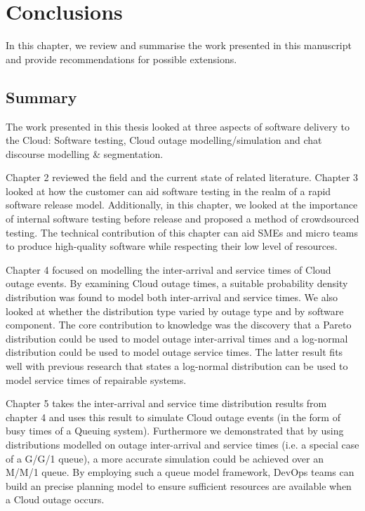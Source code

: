 
\chapter{Conclusions}\label{ch:conc} %

\begin{textsl}
{\small In this chapter, we review and summarise the work presented in this manuscript and provide
recommendations for possible extensions.}
\end{textsl}

\vspace*{1cm}

\section{Summary}
The work presented in this thesis looked at three aspects of software delivery to the Cloud: Software testing, Cloud outage modelling/simulation and chat discourse modelling \& segmentation.

Chapter 2 reviewed the field and the current state of related literature. Chapter 3 looked at how the customer can aid software testing in the realm of a rapid software release model. Additionally, in this chapter, we looked at the importance of internal software testing before release and proposed a method of crowdsourced testing. The technical contribution of this chapter can aid SMEs and micro teams to produce high-quality software while respecting their low level of resources.

Chapter 4 focused on modelling the inter-arrival and service times of Cloud outage events. By examining Cloud outage times, a suitable probability density distribution was found to model both inter-arrival and service times. We also looked at whether the distribution type varied by outage type and by software component. The core contribution to knowledge was the discovery that a Pareto distribution could be used to model outage inter-arrival times and a log-normal distribution could be used to model outage service times. The latter result fits well with previous research that states a log-normal distribution can be used to model service times of repairable systems. 

Chapter 5 takes the inter-arrival and service time distribution results from chapter 4 and uses this result to simulate Cloud outage events (in the form of busy times of a Queuing system). Furthermore we demonstrated that by using distributions modelled on outage inter-arrival and service times (i.e. a special case of a G/G/1 queue), a more accurate simulation could be achieved over an M/M/1 queue. By employing such a queue model framework, DevOps teams can build an precise planning model to ensure sufficient resources are available when a Cloud outage occurs.

